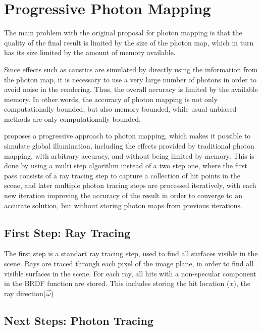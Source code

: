 \documentclass[main.tex]{subfiles}
\begin{document}
\section{Progressive Photon Mapping} \label{section:ppm}

The main problem with the original proposal for photon mapping is that the quality of the final result is limited by the size of the photon map, which in turn has its size limited by the amount of memory available.

Since effects such as caustics are simulated by directly using the information from the photon map, it is necessary to use a very large number of photons in order to avoid noise in the rendering. Thus, the overall accuracy is limited by the available memory. In other words, the accuracy of photon mapping is not only computationally bounded, but also memory bounded, while usual unbiased methods are only computationally bounded.

\cite{hachisuka2008progressive} proposes a progressive approach to photon mapping, which makes it possible to simulate global illumination, including the effects provided by traditional photon mapping, with arbitrary accuracy, and without being limited by memory. This is done by using a multi step algorithm instead of a two step one, where the first pass consists of a ray tracing step to capture a collection of hit points in the scene, and later multiple photon tracing steps are processed iteratively, with each new iteration improving the accuracy of the result in order to converge to an accurate solution, but without storing photon maps from previous iterations.


\subsection{First Step: Ray Tracing}

The first step is a standart ray tracing step, used to find all surfaces visible in the scene. Rays are traced through each pixel of the image plane, in order to find all visible surfaces in the scene. For each ray, all hits with a non-specular component in the \acs{BRDF} function are stored. This includes storing the hit location ($x$), the ray direction($\vec{\omega}$)


\subsection{Next Steps: Photon Tracing}
\end{document}

